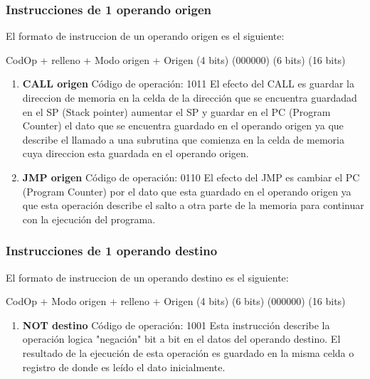 \subsubsection{Instrucciones de 1 operando origen}

El formato de instruccion de un operando origen es el siguiente:

  CodOp   +   relleno   +  Modo origen +   Origen
(4 bits)      (000000)        (6 bits)    (16 bits)

\begin{enumerate}
\item \textbf{CALL origen}
Código de operación: 1011
El efecto del CALL es guardar la direccion de memoria en la celda de la dirección que se encuentra guardadad en el SP (Stack pointer) aumentar el SP y guardar en el PC (Program Counter) el dato que se encuentra guardado en el operando origen ya que describe el llamado a una subrutina que comienza en la celda de memoria cuya direccion esta guardada en el operando origen.

\item \textbf{JMP origen}
Código de operación: 0110
El efecto del JMP es cambiar el PC (Program Counter) por el dato que esta guardado en el operando origen ya que esta operación describe el salto a otra parte de la memoria para continuar con la ejecución del programa.

\end{enumerate}

\subsubsection{Instrucciones de 1 operando destino}

El formato de instruccion de un operando destino es el siguiente:

  CodOp   +  Modo origen  +  relleno  +  Origen
(4 bits)      (6 bits)      (000000)    (16 bits)

\begin{enumerate}
\item \textbf{NOT destino}
Código de operación: 1001
Esta instrucción describe la operación logica "negación" bit a bit en el datos del operando destino. El resultado de la ejecución de esta operación es guardado en la misma celda o registro de donde es leído el dato inicialmente.
\end{enumerate}

